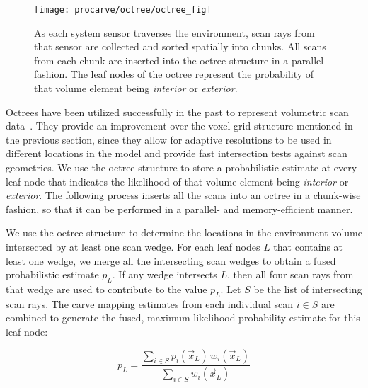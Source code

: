 \documentclass[12pt,onecolumn,oneside]{book}
\begin{document}
\begin{figure}[t]

	\centerline{\texttt{[image: procarve/octree/octree\_fig]}}

	\caption[Diagram of octree population.]{As each system sensor traverses the environment, scan rays from that sensor are collected and sorted spatially into chunks.  All scans from each chunk are inserted into the octree structure in a parallel fashion.  The leaf nodes of the octree represent the probability of that volume element being {\it interior} or {\it exterior}.}
	\label{fig:octree_population}
\end{figure}

Octrees have been utilized successfully in the past to represent volumetric scan data~\cite{Hernandez07,Octomap,OctreeSculpting}.  They provide an improvement over the voxel grid structure mentioned in the previous section, since they allow for adaptive resolutions to be used in different locations in the model and provide fast intersection tests against scan geometries.  We use the octree structure to store a probabilistic estimate at every leaf node that indicates the likelihood of that volume element being {\it interior} or {\it exterior}.  The following process inserts all the scans into an octree in a chunk-wise fashion, so that it can be performed in a parallel- and memory-efficient manner.

We use the octree structure to determine the locations in the environment volume intersected by at least one scan wedge.  For each leaf nodes $L$ that contains at least one wedge, we merge all the intersecting scan wedges to obtain a fused probabilistic estimate $p_L$.  If any wedge intersects $L$, then all four scan rays from that wedge are used to contribute to the value $p_L$.  Let $S$ be the list of intersecting scan rays.  The carve mapping estimates from each individual scan $i \in S$ are combined to generate the fused, maximum-likelihood probability estimate for this leaf node:

\begin{equation}
p_L = \dfrac{\sum\limits_{i \in S} p_i(\vec{x}_L) \, w_i(\vec{x}_L) }{ \sum\limits_{i \in S} w_i(\vec{x}_L) }
\end{equation}
\end{document}
